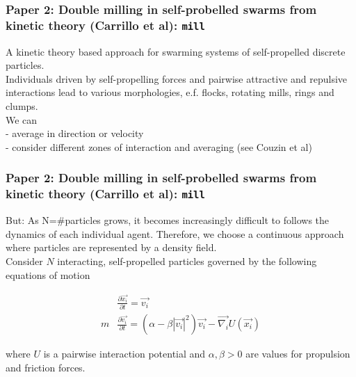 \documentclass[compress]{beamer}
\begin{document}
\begin{frame}
  \frametitle{Paper 2: Double milling in self-probelled swarms from kinetic theory (Carrillo et al): \texttt{mill}}
\small A kinetic theory based approach for swarming systems of self-propelled discrete particles. \\


  Individuals driven by self-propelling forces and pairwise attractive and repulsive interactions lead to various morphologies, e.f. flocks, rotating mills, rings and clumps. \\
  We can \\
  - average in direction or velocity \\
  - consider different zones of interaction and averaging (see Couzin et al)
  

%
%
%


\end{frame}

\begin{frame}
	\frametitle{Paper 2: Double milling in self-probelled swarms from kinetic theory (Carrillo et al): \texttt{mill}}
	
	  
	  But: As N=#particles grows, it becomes increasingly difficult to follows the dynamics of each individual agent. Therefore, we choose a continuous approach where particles are represented by a density field. \\
	  
	Consider \( N \) interacting, self-propelled particles governed by the following equations of motion
	
	
	\begin{equation} \label{eqOfMotion}
	\begin{split}
    & \frac{\partial \vec{x_{i}}}{\partial t} = \vec{v_{i}} \\
	m & \frac{\partial \vec{v_{i}}}{\partial t} = (\alpha - \beta |\vec{v_{i}}|^{2}) \vec{v_{i}} - \vec{\nabla_{i}} U(\vec{x_{i}})
	\end{split}
	\end{equation}
	
	where \( U \) is a pairwise interaction potential and \( \alpha, \beta > 0\) are values for propulsion and friction forces.\\

\end{frame}
\end{document}
